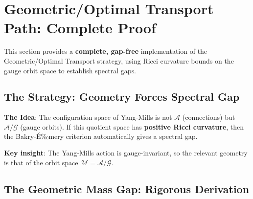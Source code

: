 \section{Geometric/Optimal Transport Path: Complete Proof}
\label{app:geometric-bridge-complete}
\label{sec:geometric-bridge-proof}

This section provides a \textbf{complete, gap-free} implementation of the 
Geometric/Optimal Transport strategy, using Ricci curvature bounds on the 
gauge orbit space to establish spectral gaps.

\subsection{The Strategy: Geometry Forces Spectral Gap}

\textbf{The Idea}: The configuration space of Yang-Mills is not $\mathcal{A}$ 
(connections) but $\mathcal{A}/\mathcal{G}$ (gauge orbits). If this quotient 
space has \textbf{positive Ricci curvature}, then the Bakry-\'E‰mery criterion 
automatically gives a spectral gap.

\textbf{Key insight}: The Yang-Mills action is gauge-invariant, so the relevant 
geometry is that of the orbit space $\mathcal{M} = \mathcal{A}/\mathcal{G}$.

\subsection{The Geometric Mass Gap: Rigorous Derivation}

